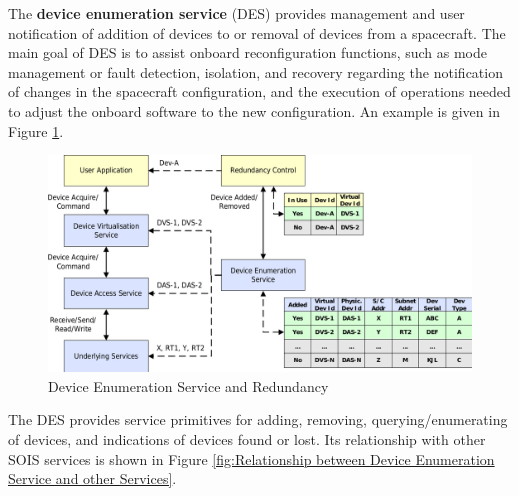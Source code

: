 The \textbf{device enumeration service} (DES) provides management and user notification of addition of devices to or removal of devices from a spacecraft. The main goal of DES is to assist onboard reconfiguration functions, such as mode management or fault detection, isolation, and recovery regarding the notification of changes in the spacecraft configuration, and the execution of operations needed to adjust the onboard software to the new configuration. An example is given in Figure \ref{fig:Device Enumeration Service and Redundancy}.

\begin{figure}[h]
\centering\includegraphics[scale=0.3]{fig/device_enumeration_service_and_redundancy}
\caption{Device Enumeration Service and Redundancy}
\label{fig:Device Enumeration Service and Redundancy}
\end{figure}

The DES provides service primitives for adding, removing, querying/enumerating of devices, and indications of devices found or lost. Its relationship with other SOIS services is shown in Figure \ref{fig:Relationship between Device Enumeration Service and other Services}.

